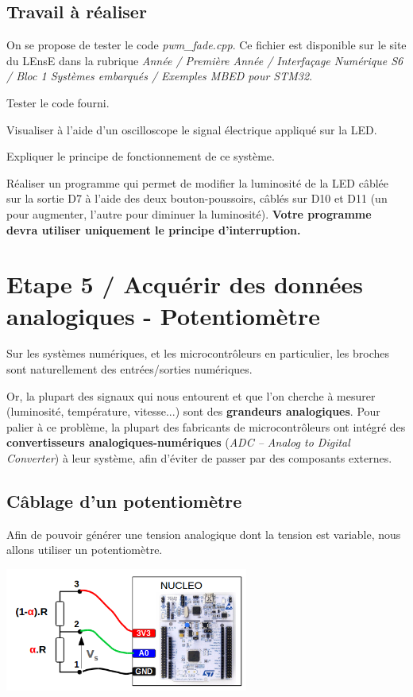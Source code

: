 \documentclass[a4paper,11pt,titlepage]{article} %
\begin{document}
\subsection{Travail à réaliser}


On se propose de tester le code \textsl{pwm\_fade.cpp}. Ce fichier est disponible sur le site du LEnsE dans la rubrique \textit{Année / Première Année / Interfaçage Numérique S6 / Bloc 1 Systèmes embarqués / Exemples MBED pour STM32}.

\Manip Tester le code fourni. 

\Manip Visualiser à l'aide d'un oscilloscope le signal électrique appliqué sur la LED.

\Quest Expliquer le principe de fonctionnement de ce système.

\Manip Réaliser un programme qui permet de modifier la luminosité de la LED câblée sur la sortie D7 à l'aide des deux bouton-poussoirs, câblés sur D10 et D11 (un pour augmenter, l'autre pour diminuer la luminosité). \textbf{Votre programme devra utiliser uniquement le principe d'interruption.}


\newpage
\section{Etape 5 / Acquérir des données analogiques - Potentiomètre}

Sur les systèmes numériques, et les microcontrôleurs en particulier, les broches sont naturellement des entrées/sorties numériques.

Or, la plupart des signaux qui nous entourent et que l'on cherche à mesurer (luminosité, température, vitesse...) sont des \textbf{grandeurs analogiques}. Pour palier à ce problème, la plupart des fabricants de microcontrôleurs ont intégré des \textbf{convertisseurs analogiques-numériques} (\textit{ADC – Analog to Digital Converter}) à leur système, afin d'éviter de passer par des composants externes.


\subsection{Câblage d'un potentiomètre}

Afin de pouvoir générer une tension analogique dont la tension est variable, nous allons utiliser un potentiomètre.

\begin{center}
	\includegraphics[width=0.6\textwidth]{images/MINE_Nucleo_CablagePotentiometre.png}
\end{center}
\end{document}
